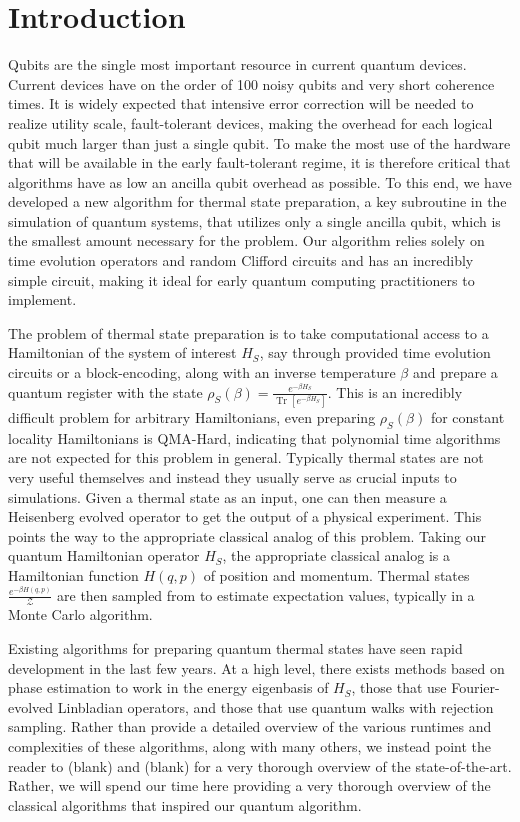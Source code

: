 \documentclass{article}
\newcommand{\brackets}[1]{\left[ #1 \right]}
\DeclareMathOperator{\Tr}{Tr}
\newcommand{\trace}[1]{\Tr \brackets{ #1 }}
\newcommand{\partfun}{\mathcal{Z}}
\begin{document}
\section{Introduction}
Qubits are the single most important resource in current quantum devices. Current devices have on the order of 100 noisy qubits and very short coherence times. It is widely expected that intensive error correction will be needed to realize utility scale, fault-tolerant devices, making the overhead for each logical qubit much larger than just a single qubit. To make the most use of the hardware that will be available in the early fault-tolerant regime, it is therefore critical that algorithms have as low an ancilla qubit overhead as possible. To this end, we have developed a new algorithm for thermal state preparation, a key subroutine in the simulation of quantum systems, that utilizes only a single ancilla qubit, which is the smallest amount necessary for the problem. Our algorithm relies solely on time evolution operators and random Clifford circuits and has an incredibly simple circuit, making it ideal for early quantum computing practitioners to implement. 

The problem of thermal state preparation is to take computational access to a Hamiltonian of the system of interest $H_S$, say through provided time evolution circuits or a block-encoding, along with an inverse temperature $\beta$ and prepare a quantum register with the state $\rho_S(\beta) = \frac{e^{-\beta H_S}}{\trace{e^{-\beta H_S}}}$. This is an incredibly difficult problem for arbitrary Hamiltonians, even preparing $\rho_S(\beta)$ for constant locality Hamiltonians is QMA-Hard, indicating that polynomial time algorithms are not expected for this problem in general. Typically thermal states are not very useful themselves and instead they usually serve as crucial inputs to simulations. Given a thermal state as an input, one can then measure a Heisenberg evolved operator to get the output of a physical experiment. This points the way to the appropriate classical analog of this problem. Taking our quantum Hamiltonian operator $H_S$, the appropriate classical analog is a Hamiltonian function $H(q, p)$ of position and momentum. Thermal states $\frac{e^{-\beta H(q,p)}}{\partfun}$ are then sampled from to estimate expectation values, typically in a Monte Carlo algorithm. 

Existing algorithms for preparing quantum thermal states have seen rapid development in the last few years. At a high level, there exists methods based on phase estimation to work in the energy eigenbasis of $H_S$, those that use Fourier-evolved Linbladian operators, and those that use quantum walks with rejection sampling. Rather than provide a detailed overview of the various runtimes and complexities of these algorithms, along with many others, we instead point the reader to (blank) and (blank) for a very thorough overview of the state-of-the-art. Rather, we will spend our time here providing a very thorough overview of the classical algorithms that inspired our quantum algorithm. 
\end{document}
